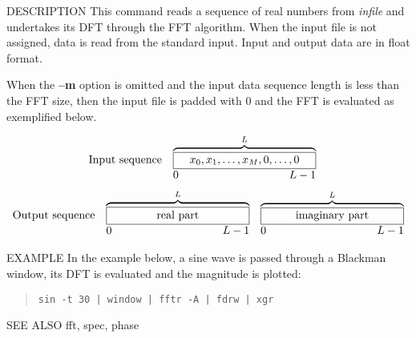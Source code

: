 \begin{qsection}{DESCRIPTION}
This command reads a sequence of real numbers from {\em infile}
and undertakes its DFT through the FFT algorithm.
When the input file is not assigned, data is read from the standard
input.
Input and output data are in float format.
\par
When the {\bf --m} option is omitted
and the input data sequence length is less than the FFT size,
then the input file is padded with 0 and the FFT is evaluated
as exemplified below.

\begin{displaymath}
\begin{array}{lll}
\mbox{Input sequence} & 
\overbrace{\framebox[4.5cm]{$x_0, x_1, \ldots, x_{M}, 0,
					\ldots,0$}}^{L}  & \\
		& \makebox[4.5cm]{0\hfill $L-1$} &
\end{array}
\end{displaymath}
\begin{displaymath}
\begin{array}{lll}
\mbox{Output sequence} & \overbrace{\framebox[4.5cm]{real part}}^{L} &
	   \overbrace{\framebox[4.5cm]{imaginary part}}^{L} \\
		& \makebox[4.5cm]{0\hfill $L-1$} &
		\makebox[4.5cm]{0\hfill $L-1$}
\end{array}
\end{displaymath}
\end{qsection}

\begin{options}
\end{options}

\begin{qsection}{EXAMPLE}
In the example below, a sine wave is passed through a Blackman window,
its DFT is evaluated and the magnitude is plotted:
\begin{quote}
  \verb!sin -t 30 | window | fftr -A | fdrw | xgr!
\end{quote}

\end{qsection}

\begin{qsection}{SEE ALSO}
  fft, spec, phase
\end{qsection}
